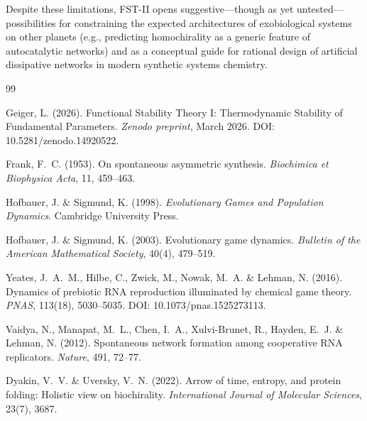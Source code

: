 \documentclass[12pt,a4paper]{article}
\theoremstyle{remark}
\begin{document}
Despite these limitations, FST-II opens suggestive---though as yet untested---possibilities for constraining the expected architectures of exobiological systems on other planets (e.g., predicting homochirality as a generic feature of autocatalytic networks) and as a conceptual guide for rational design of artificial dissipative networks in modern synthetic systems chemistry.



\begin{thebibliography}{99}

Geiger, L. (2026).
\newblock Functional Stability Theory I: Thermodynamic Stability of Fundamental Parameters.
\newblock \textit{Zenodo preprint}, March 2026.
\newblock DOI: 10.5281/zenodo.14920522.

Frank, F.~C. (1953).
\newblock On spontaneous asymmetric synthesis.
\newblock \textit{Biochimica et Biophysica Acta}, 11, 459--463.

Hofbauer, J. \& Sigmund, K. (1998).
\newblock \textit{Evolutionary Games and Population Dynamics}.
\newblock Cambridge University Press.

Hofbauer, J. \& Sigmund, K. (2003).
\newblock Evolutionary game dynamics.
\newblock \textit{Bulletin of the American Mathematical Society}, 40(4), 479--519.

Yeates, J.~A.~M., Hilbe, C., Zwick, M., Nowak, M.~A. \& Lehman, N. (2016).
\newblock Dynamics of prebiotic RNA reproduction illuminated by chemical game theory.
\newblock \textit{PNAS}, 113(18), 5030--5035.
\newblock DOI: 10.1073/pnas.1525273113.

Vaidya, N., Manapat, M.~L., Chen, I.~A., Xulvi-Brunet, R., Hayden, E.~J. \& Lehman, N. (2012).
\newblock Spontaneous network formation among cooperative RNA replicators.
\newblock \textit{Nature}, 491, 72--77.

Dyakin, V.~V. \& Uversky, V.~N. (2022).
\newblock Arrow of time, entropy, and protein folding: Holistic view on biochirality.
\newblock \textit{International Journal of Molecular Sciences}, 23(7), 3687.


\end{thebibliography}
\end{document}
